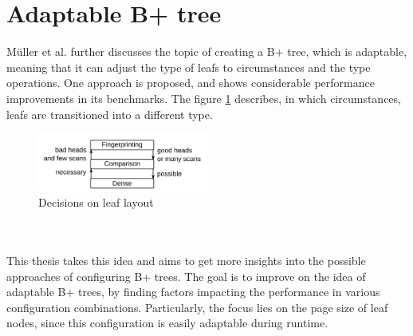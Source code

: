\section{Adaptable B+ tree}
Müller et al. \parencite{mueller2024} further discusses the topic of creating a B+ tree, which is adaptable, meaning that it can adjust the type of leafs to circumstances and the type operations. One approach is proposed, and shows considerable performance improvements in its benchmarks. The figure \ref{fig:adapt} describes, in which circumstances, leafs are transitioned into a different type.
  \begin{figure}[h]
      \centering
      \includegraphics[width=0.5\textwidth]{images/adapt.png}
      \caption{Decisions on leaf layout \parencite{mueller2024}}
      \label{fig:adapt}
  \end{figure}
\\\\
This thesis takes this idea and aims to get more insights into the possible approaches of configuring B+ trees. The goal is to improve on the idea of adaptable B+ trees, by finding factors impacting the performance in various configuration combinations. Particularly, the focus lies on the page size of leaf nodes, since this configuration is easily adaptable during runtime. 
